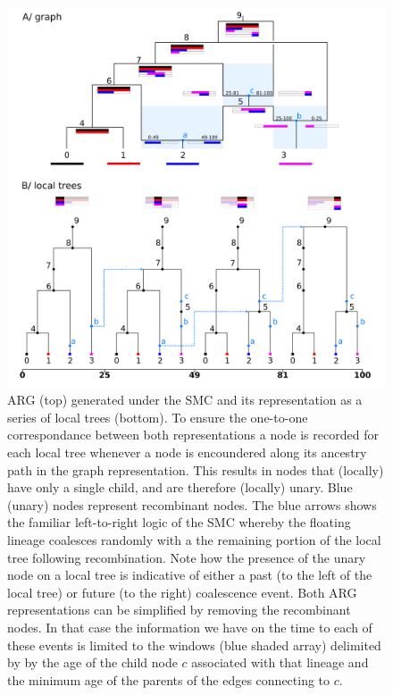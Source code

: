 \documentclass{article}
\begin{document}
\begin{figure}[!ht]
\centering
\includegraphics[width=\textwidth]{figures/smc_custom_2rows_area.png}
\caption{ARG (top) generated under the SMC and its representation as a
series of local trees (bottom). To ensure the one-to-one correspondance
between both representations a node is recorded for each local tree whenever
a node is encoundered along its ancestry path in the graph representation.
This results in nodes that (locally) have only a single child, and are therefore
(locally) unary. Blue (unary) nodes represent recombinant nodes.
The blue arrows shows the familiar left-to-right logic of the SMC whereby
the floating lineage coalesces randomly
with a the remaining portion of the local tree following recombination.
Note how the presence of the unary node on a local tree is
indicative of either a past (to the left of the local tree)
or future (to the right) coalescence event.
Both ARG representations can be simplified by removing the recombinant nodes.
In that case the information we have on the time to each of these events is
limited to the windows (blue shaded array) delimited by by the age of
the child node $c$ associated with that lineage and the minimum age of
the parents of the edges connecting to $c$.
}
\label{fig:smc-unary}
\end{figure}
\end{document}
